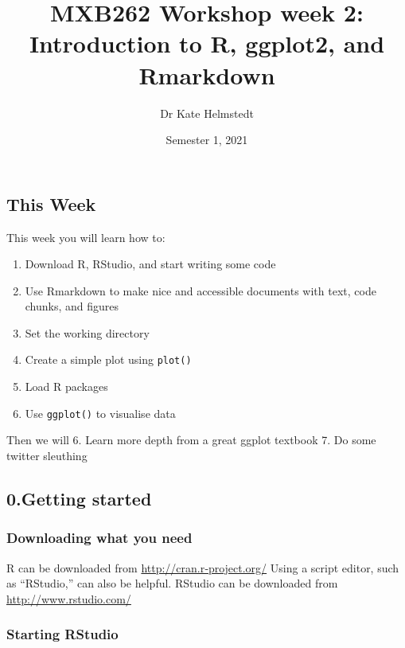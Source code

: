 \documentclass[]{article}
\title{MXB262 Workshop week 2: Introduction to R, ggplot2, and Rmarkdown}
\author{Dr Kate Helmstedt}
\date{Semester 1, 2021}
\providecommand{\tightlist}{%
  \setlength{\itemsep}{0pt}\setlength{\parskip}{0pt}}
\begin{document}
\maketitle

\hypertarget{this-week}{%
\subsection{This Week}\label{this-week}}

This week you will learn how to:

\begin{enumerate}
\def\labelenumi{\arabic{enumi}.}
\setcounter{enumi}{-1}
\tightlist
\item
  Download R, RStudio, and start writing some code
\item
  Use Rmarkdown to make nice and accessible documents with text, code
  chunks, and figures\\
\item
  Set the working directory\\
\item
  Create a simple plot using \texttt{plot()}
\item
  Load R packages
\item
  Use \texttt{ggplot()} to visualise data
\end{enumerate}

Then we will 6. Learn more depth from a great ggplot textbook 7. Do some
twitter sleuthing

\hypertarget{getting-started}{%
\subsection{0.Getting started}\label{getting-started}}

\hypertarget{downloading-what-you-need}{%
\subsubsection{Downloading what you
need}\label{downloading-what-you-need}}

R can be downloaded from \url{http://cran.r‐project.org/} Using a script
editor, such as ``RStudio,'' can also be helpful. RStudio can be
downloaded from \url{http://www.rstudio.com/}

\hypertarget{starting-rstudio}{%
\subsubsection{Starting RStudio}\label{starting-rstudio}}
\end{document}
